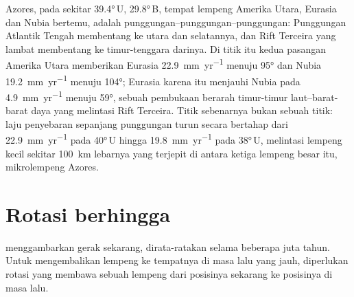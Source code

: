 \begin{omfigure}
\par{}
\label{fig:b1:plate-kinematics:rrr}
\end{omfigure}

 Azores, pada sekitar \ang{39.4}\,U, \ang{29.8}\,B, tempat lempeng Amerika Utara, Eurasia dan Nubia bertemu, adalah  punggungan--punggungan--punggungan:
Punggungan Atlantik Tengah membentang ke utara dan selatannya, dan Rift Terceira yang lambat membentang ke timur-tenggara darinya. Di titik itu kedua  pasangan Amerika Utara memberikan Eurasia \qty{22.9}{mm.yr^{-1}} menuju \ang{95} dan Nubia \qty{19.2}{mm.yr^{-1}} menuju \ang{104};
Eurasia karena itu menjauhi Nubia pada \qty{4.9}{mm.yr^{-1}} menuju \ang{59}, sebuah pembukaan berarah timur-timur laut--barat-barat daya yang melintasi Rift Terceira. Titik sebenarnya bukan sebuah titik: laju penyebaran sepanjang punggungan turun secara bertahap
dari \qty{22.9}{mm.yr^{-1}} pada \ang{40}\,U hingga \qty{19.8}{mm.yr^{-1}} pada \ang{38}\,U, melintasi lempeng kecil sekitar \qty{100}{km} lebarnya yang terjepit di antara ketiga lempeng besar itu, mikrolempeng Azores.

\section{Rotasi berhingga}

 menggambarkan gerak sekarang, dirata-ratakan selama beberapa juta tahun. Untuk mengembalikan lempeng ke tempatnya di masa lalu yang jauh, diperlukan rotasi yang membawa sebuah lempeng dari posisinya sekarang ke posisinya di masa lalu.

